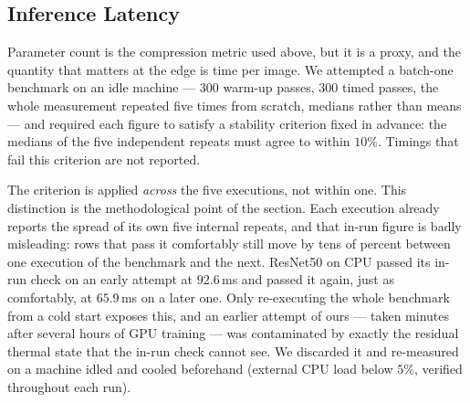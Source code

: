\documentclass[conference]{IEEEtran}
\begin{document}
\begin{table}
  \centering
  \caption{Two routes to an int8 student, on the same five distilled students and
  the same split (mean~$\pm$~SD over training seeds). Mixed-precision PTQ keeps two
  blocks ($0.08\%$ of parameters) in float and needs no retraining; QAT quantizes
  everything but requires a fine-tuning phase. The cheaper method is also the more
  accurate one.}
  \label{tab:qat}
\end{table}

\subsection{Inference Latency}
\label{sec:latency}

Parameter count is the compression metric used above, but it is a proxy, and the
quantity that matters at the edge is time per image. We attempted a batch-one
benchmark on an idle machine --- $300$ warm-up passes, $300$ timed passes, the
whole measurement repeated five times from scratch, medians rather than means ---
and required each figure to satisfy a stability criterion fixed in advance: the
medians of the five independent repeats must agree to within $10\%$. Timings that
fail this criterion are not reported.

The criterion is applied \emph{across} the five executions, not within one. This
distinction is the methodological point of the section. Each execution already
reports the spread of its own five internal repeats, and that in-run figure is
badly misleading: rows that pass it comfortably still move by tens of percent
between one execution of the benchmark and the next. ResNet50 on CPU passed its
in-run check on an early attempt at $92.6$\,ms and passed it again, just as
comfortably, at $65.9$\,ms on a later one. Only re-executing the whole benchmark
from a cold start exposes this, and an earlier attempt of ours --- taken minutes
after several hours of GPU training --- was contaminated by exactly the residual
thermal state that the in-run check cannot see. We discarded it and re-measured
on a machine idled and cooled beforehand (external CPU load below $5\%$, verified
throughout each run).
\end{document}
